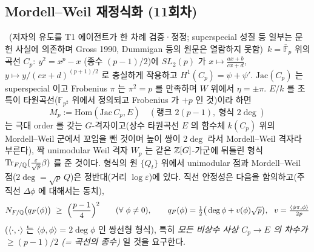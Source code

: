 \subsection{Mordell--Weil 재정식화 (11회차)}
\begin{theorem}\label{thm:MW}\tagPL\ (저자의 유도를 T1 에이전트가 한 차례 검증·정정; superspecial 성질 등 일부는 문헌 사실에 의존하며 Gross 1990, Dummigan 등의 원문은 열람하지 못함)\
$k=\overline{\mathbb F}_p$ 위의 곡선 $C_p:\ y^2=x^p-x$ (종수 $(p-1)/2$)에 $SL_2(p)$ 가 $x\mapsto\tfrac{ax+b}{cx+d}$, $y\mapsto y/(cx+d)^{(p+1)/2}$ 로 충실하게 작용하고 $H^1(C_p)=\psi+\psi'$. $\mathrm{Jac}(C_p)$ 는 superspecial 이고 Frobenius $\pi$ 는 $\pi^2=p$ 를 만족하며 $W$ 위에서 $\eta=\pm\pi$. $E/k$ 를 초특이 타원곡선($\mathbb F_{p^2}$ 위에서 정의되고 Frobenius 가 $+p$ 인 것)이라 하면
\[
M_p:=\mathrm{Hom}(\mathrm{Jac}\,C_p,E)\quad(\text{랭크 }2(p-1),\ \text{형식 }2\deg)
\]
는 극대 order 를 갖는 $G$-격자이고(상수 타원곡선 $E$ 의 함수체 $k(C_p)$ 위의 Mordell--Weil 군에서 꼬임을 뺀 것이며 높이 쌍이 $2\deg$ 라서 Mordell--Weil 격자라 부른다), 짝 unimodular Weil 격자 $W_p$ 는 같은 $\mathbb{Z}[G]$-가군에 뒤틀린 형식 $\mathrm{Tr}_{F/\mathbb{Q}}(\tfrac{\varepsilon}{\sqrt p}\beta)$ 를 준 것이다. 형식의 원 $\{Q_t\}$ 위에서 unimodular 점과 Mordell--Weil 점($2\deg=\sqrt p\,Q$)은 정반대(거리 $\log\varepsilon$)에 있다. 직선 안정성은 다음을 함의하고(주 직선 $\Delta\phi$ 에 대해서는 동치),
\[
N_{F/\Q}\big(q_F(\phi)\big)\ \ge\ \Big(\frac{p-1}4\Big)^2\qquad(\forall\ \phi\ne0),\qquad q_F(\phi)=\tfrac12\big(\deg\phi+v(\phi)\sqrt p\big),\ \ v=\tfrac{\langle\phi\pi,\phi\rangle}{2p}
\]
($\langle\cdot,\cdot\rangle$ 는 $\langle\phi,\phi\rangle=2\deg\phi$ 인 쌍선형 형식), 특히 \emph{모든 비상수 사상 $C_p\to E$ 의 차수가 $\ge(p-1)/2$ (= 곡선의 종수)} 일 것을 요구한다.
\end{theorem}
